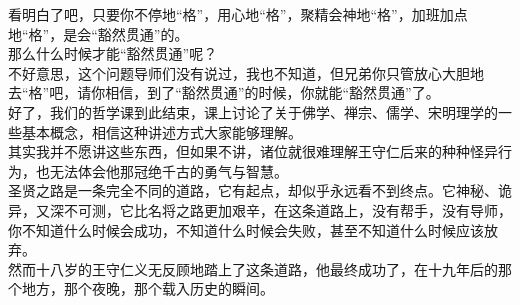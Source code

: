 \begin{multicols}{\theparacolNo}
看明白了吧，只要你不停地“格”，用心地“格”，聚精会神地“格”，加班加点地“格”，是会“豁然贯通”的。\\

那么什么时候才能“豁然贯通”呢？\\

不好意思，这个问题导师们没有说过，我也不知道，但兄弟你只管放心大胆地去“格”吧，请你相信，到了“豁然贯通”的时候，你就能“豁然贯通”了。\\

好了，我们的哲学课到此结束，课上讨论了关于佛学、禅宗、儒学、宋明理学的一些基本概念，相信这种讲述方式大家能够理解。\\

其实我并不愿讲这些东西，但如果不讲，诸位就很难理解王守仁后来的种种怪异行为，也无法体会他那冠绝千古的勇气与智慧。\\

圣贤之路是一条完全不同的道路，它有起点，却似乎永远看不到终点。它神秘、诡异，又深不可测，它比名将之路更加艰辛，在这条道路上，没有帮手，没有导师，你不知道什么时候会成功，不知道什么时候会失败，甚至不知道什么时候应该放弃。\\

然而十八岁的王守仁义无反顾地踏上了这条道路，他最终成功了，在十九年后的那个地方，那个夜晚，那个载入历史的瞬间。\\
\ifnum{}
	\end{multicols}
\fi
\newpage
